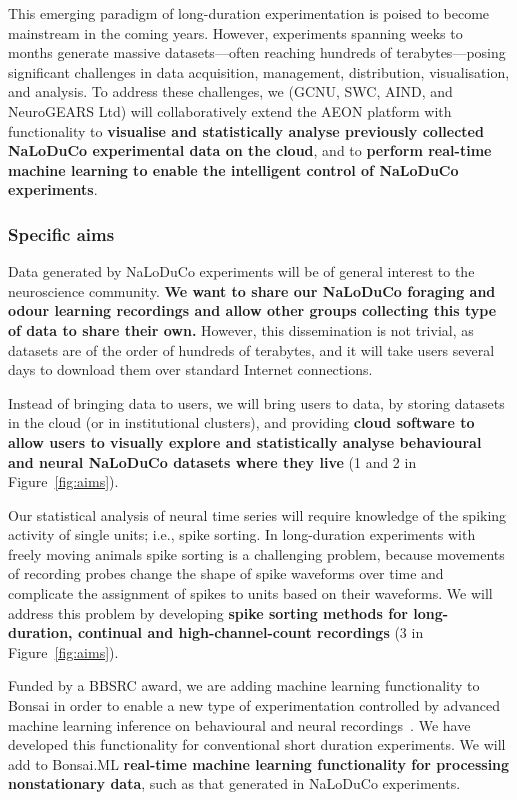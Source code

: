 This emerging paradigm of long-duration experimentation is poised to become
mainstream in the coming years.
%
However, experiments spanning weeks to months generate massive datasets—often
reaching hundreds of terabytes—posing significant challenges in data
acquisition, management, distribution, visualisation, and analysis.
%
To address these challenges, we (GCNU, SWC, AIND, and NeuroGEARS Ltd) will
collaboratively extend the AEON platform with functionality to
\textbf{visualise and statistically analyse previously collected NaLoDuCo
experimental data on the cloud}, and to \textbf{perform real-time machine learning to enable the
intelligent control of NaLoDuCo experiments}.

\subsubsection{Specific aims}

Data generated by NaLoDuCo experiments will be of general interest to the
neuroscience community. \textbf{We want to share our NaLoDuCo foraging and odour
learning recordings and allow other groups collecting this type of data to
share their own.}
%
However, this dissemination is not trivial, as datasets are of the order of
hundreds of terabytes, and it will take users several days to download them
over standard Internet connections.

Instead of bringing data to users, we will bring users to data, by storing
datasets in the cloud (or in institutional clusters), and providing
\textbf{cloud software to allow users to visually explore and statistically
analyse behavioural and neural NaLoDuCo datasets where they live}
(1 and 2 in Figure~\ref{fig:aims}).

Our statistical analysis of neural time series will require knowledge of the
spiking activity of single units; i.e., spike sorting. In long-duration
experiments with freely moving animals spike sorting is a challenging problem,
because movements of recording probes change the shape of spike waveforms over
time and complicate the assignment of spikes to units based on their waveforms.
We will address this problem by developing \textbf{spike sorting methods for
long-duration, continual and high-channel-count recordings} (3 in
Figure~\ref{fig:aims}).

Funded by a BBSRC award, we are adding machine learning functionality to Bonsai
in order to enable a new type of experimentation controlled by advanced machine
learning inference on behavioural and neural
recordings~\citep[Bonsai.ML,][]{bonsaiML25}. We have developed this
functionality for conventional short duration experiments. We will add to
Bonsai.ML \textbf{real-time machine learning functionality for processing
nonstationary data}, such as that generated in NaLoDuCo experiments.

